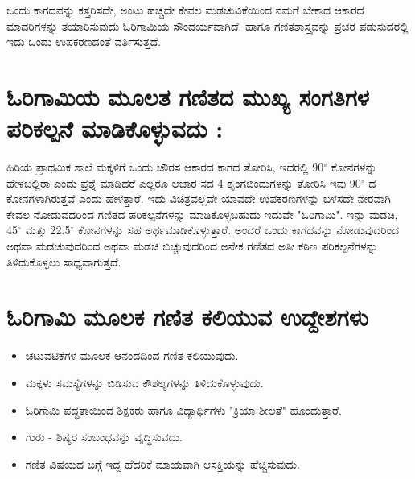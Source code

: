 ಒಂದು ಕಾಗದವನ್ನು ಕತ್ತರಿಸದೇ, ಅಂಟು ಹಚ್ಚದೇ ಕೇವಲ ಮಡಚುವಿಕೆಯಿಂದ ನಮಗೆ ಬೇಕಾದ ಆಕಾರದ ಮಾದರಿಗಳನ್ನು ತಯಾರಿಸುವುದು ಓರಿಗಾಮಿಯ ಸೌಂದರ್ಯವಾಗಿದೆ. ಹಾಗೂ ಗಣಿತಶಾಸ್ತ್ರವನ್ನು ಪ್ರಚರ ಪಡುಸುದರಲ್ಲಿ ಇದು ಒಂದು ಉಪಕರಣದಂತೆ ವರ್ತಿಸುತ್ತದೆ. 

\section*{ಓರಿಗಾಮಿಯ ಮೂಲತ ಗಣಿತದ ಮುಖ್ಯ ಸಂಗತಿಗಳ ಪರಿಕಲ್ಪನೆ ಮಾಡಿಕೊಳ್ಳುವದು :}

ಹಿರಿಯ ಪ್ರಾಥಮಿಕ ಶಾಲೆ ಮಕ್ಕಳಿಗೆ ಒಂದು ಚೌರಸ ಆಕಾರದ ಕಾಗದ ತೋರಿಸಿ, ಇದರಲ್ಲಿ 90$^{\circ}$ ಕೋನಗಳನ್ನು ಹೇಳಬಲ್ಲಿರಾ ಎಂದು ಪ್ರಶ್ನೆ ಮಾಡಿದರೆ ಎಲ್ಲರೂ ಆಚಾರ ಸದ  4 ಶೃಂಗಬಿಂದುಗಳನ್ನು ತೋರಿಸಿ ಇವು 90$^{\circ}$ ದ ಕೋನಗಳಾಗಿರುತ್ತವೆ ಎಂದು ಹೇಳತ್ತಾರೆ. ಇದು ವಿಚಿತ್ರವಲ್ಲವೇ ಯಾವದೇ ಉಪಕರಣಗಳನ್ನು ಬಳಸದೇ ನೇರವಾಗಿ ಕೇವಲ ನೋಡುವದರಿಂದ ಗಣಿತದ ಪರಿಕಲ್ಪನೆಗಳನ್ನು ಮಾಡಿಕೊಳ್ಳಬಹುದು ಇದುವೇ "ಓರಿಗಾಮಿ". ಇನ್ನು ಮಡಚಿ, 45$^{\circ}$ ಮತ್ತು 22.5$^{\circ}$ ಕೋನಗಳನ್ನು ಸಹ ಅರ್ಥಮಾಡಿಕೊಳ್ಳುತ್ತಾರೆ. ಅಂದರೆ ಒಂದು ಕಾಗದವನ್ನು ನೋಡುವುದರಿಂದ ಅಥವಾ ಮಡಚುವುದರಿಂದ ಅಥವಾ ಮಡಚಿ ಬಿಚ್ಚುವುದರಿಂದ ಅನೇಕ ಗಣಿತದ ಅತೀ ಕಠಿಣ ಪರಿಕಲ್ಪನೆಗಳನ್ನು ತಿಳಿದುಕೊಳ್ಳಲು ಸಾಧ್ಯವಾಗುತ್ತದೆ. 

\section*{ಓರಿಗಾಮಿ ಮೂಲಕ ಗಣಿತ ಕಲಿಯುವ ಉದ್ದೇಶಗಳು}
\begin{itemize}
\item ಚಟುವಟಿಕೆಗಳ ಮೂಲಕ ಆನಂದದಿಂದ ಗಣಿತ ಕಲಿಯುವುದು.
\item  ಮಕ್ಕಳು ಸಮಸ್ಯೆಗಳನ್ನು ಬಿಡಿಸುವ ಕೌಶಲ್ಯಗಳನ್ನು ತಿಳಿದುಕೊಳ್ಳುವುದು. 
\item ಓರಿಗಾಮಿ ಪದ್ಧತಾಯಿಂದ ಶಿಕ್ಷಕರು ಹಾಗೂ ವಿದ್ಯಾರ್ಥಿಗಳು "ಕ್ರಿಯಾ ಶೀಲತೆ" ಹೊಂದುತ್ತಾರೆ.
\item ಗುರು - ಶಿಷ್ಯರ ಸಂಬಂಧವನ್ನು ವೃದ್ಧಿಸುವದು. 
\item  ಗಣಿತ  ವಿಷಯದ ಬಗ್ಗೆ ಇದ್ದ ಹೆದರಿಕೆ ಮಾಯವಾಗಿ ಆಸಕ್ತಿಯನ್ನು ಹೆಚ್ಚಿಸುವುದು. 
\end{itemize}

